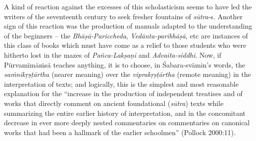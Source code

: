 A kind of reaction against the excesses of this scholasticism seems to have led the writers of the seventeenth century to seek fresher fountains of {\sl sūtra}-s. Another sign of this reaction was the production of manuals adapted to the understanding of the beginners – the {\sl Bhāṣā-Pariccheda}, {\sl Vedānta-paribhāṣā}, etc are instances of this class of books which must have come as a relief to those students who were hitherto lost in the mazes of {\sl Pañca-Lakṣaṇī} and {\sl Advaita-siddhi}. Now, if Pūrvamīmāṁsā teaches anything, it is to choose, in Śabara-svāmin’s words, the {\sl saṁnikṛṣṭārtha} (nearer meaning) over the {\sl viprakṛṣṭārtha} (remote meaning) in the interpretation of texts; and logically, this is the simplest and most reasonable explanation for the “increase in the production of independent treatises and of works that directly comment on ancient foundational ({\sl sūtra}) texts while summarizing the entire earlier history of interpretation, and in the concomitant decrease in ever more deeply nested commentaries on commentaries on canonical works that had been a hallmark of the earlier schoolmen” (Pollock 2000:11).

